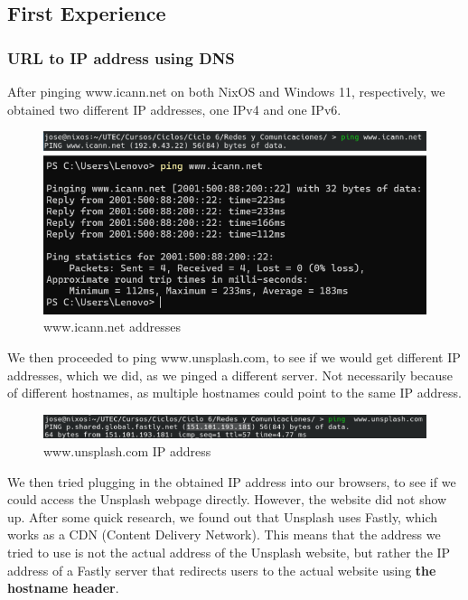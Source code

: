 \subsection{First Experience}

\subsubsection{URL to IP address using DNS}
After pinging www.icann.net on both NixOS and Windows 11, respectively, we
obtained two different IP addresses, one IPv4 and one IPv6.

\begin{figure}[htbp]
    \centering
    \includegraphics[width=1\linewidth]{img/1.png}
    \caption{www.icann.net addresses}\label{fig:1}
\end{figure}

We then proceeded to ping www.unsplash.com, to see if we would get different IP
addresses, which we did, as we pinged a different server. Not necessarily
because of different hostnames, as multiple hostnames could point to the same
IP address.

\begin{figure}[htbp]
    \centering
    \includegraphics[width=1\linewidth]{img/2.png}
    \caption{www.unsplash.com IP address}\label{fig:2}
\end{figure}

We then tried plugging in the obtained IP address into our browsers, to see if
we could access the Unsplash webpage directly. However, the website did not
show up. After some quick research, we found out that Unsplash uses Fastly,
which works as a CDN (Content Delivery Network). This means that the address we
tried to use is not the actual address of the Unsplash website, but rather the
IP address of a Fastly server that redirects users to the actual website using
\textbf{the hostname header}.


